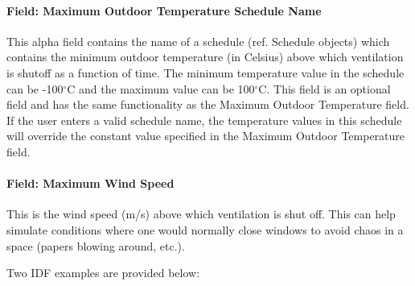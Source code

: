 \paragraph{Field: Maximum Outdoor Temperature Schedule Name}\label{field-maximum-outdoor-temperature-schedule-name}

This alpha field contains the name of a schedule (ref. Schedule objects) which contains the minimum outdoor temperature (in Celsius) above which ventilation is shutoff as a function of time. The minimum temperature value in the schedule can be -100$^\circ$C and the maximum value can be 100$^\circ$C. This field is an optional field and has the same functionality as the Maximum Outdoor Temperature field. If the user enters a valid schedule name, the temperature values in this schedule will override the constant value specified in the Maximum Outdoor Temperature field.

\paragraph{Field: Maximum Wind Speed}\label{field-maximum-wind-speed}

This is the wind speed (m/s) above which ventilation is shut off. This can help simulate conditions where one would normally close windows to avoid chaos in a space (papers blowing around, etc.).

Two IDF examples are provided below:

